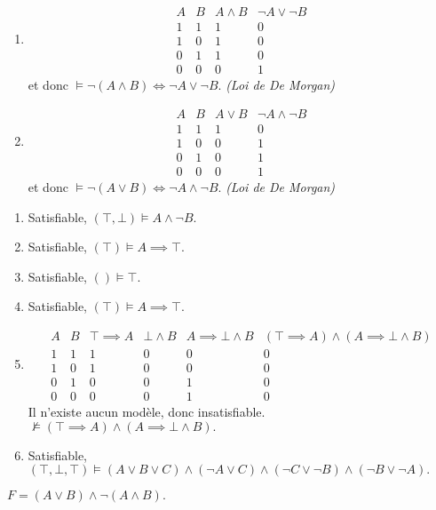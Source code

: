 \documentclass[12pt,french,a4paper]{article}
\begin{document}
\begin{question}
\begin{enumerate}
\item\begin{displaymath}
\begin{array}{cc|ccc}
A & B & A \wedge B &  \neg A \vee \neg B\\
\hline
1 & 1 & 1 & 0\\
1 & 0 & 1 & 0\\
0 & 1 & 1 & 0\\
0 & 0 & 0 & 1
\end{array}
\end{displaymath}
et donc $\vDash  \neg(A \wedge B) \iff  \neg A \vee \neg B.$ \hfill \emph{(Loi de De Morgan)}


\item\begin{displaymath}
\begin{array}{cc|ccc}
A & B & A \vee B &  \neg A \wedge \neg B\\
\hline
1 & 1 & 1 & 0\\
1 & 0 & 0 & 1\\
0 & 1 & 0 & 1\\
0 & 0 & 0 & 1
\end{array}
\end{displaymath}
et donc $\vDash  \neg(A \vee B) \iff  \neg A \wedge \neg B.$ \hfill \emph{(Loi de De Morgan)}

\end{enumerate}
\end{question}

\begin{question}
\begin{enumerate}

\item Satisfiable, $(\top, \bot) \vDash A \wedge \neg B.$
\item Satisfiable, $(\top) \vDash A \implies \top.$
\item Satisfiable, $() \vDash \top.$
\item Satisfiable, $(\top) \vDash A \implies \top.$

\item\begin{displaymath}
\begin{array}{cc|cccc}
A & B & \top \implies A & \bot \wedge B &  A \implies \bot \wedge B &  (\top \implies A) \wedge( A \implies \bot \wedge B) \\
\hline
1 & 1 & 1 & 0 & 0 & 0\\
1 & 0 & 1 & 0 & 0 & 0\\
0 & 1 & 0 & 0 & 1 & 0\\
0 & 0 & 0 & 0 & 1 & 0
\end{array}
\end{displaymath}
Il n'existe aucun modèle, donc insatisfiable. $\not \vDash (\top \implies A) \wedge( A \implies \bot \wedge B).$

\item Satisfiable, $(\top, \bot, \top) \vDash (A \vee B \vee C) \wedge (\neg A \vee C) \wedge (\neg C \vee \neg B) \wedge (\neg B \vee \neg A).$

\end{enumerate}
\end{question}

\begin{question}
$F = (A \vee B) \wedge \neg (A \wedge B).$
\end{question}
\end{document}
